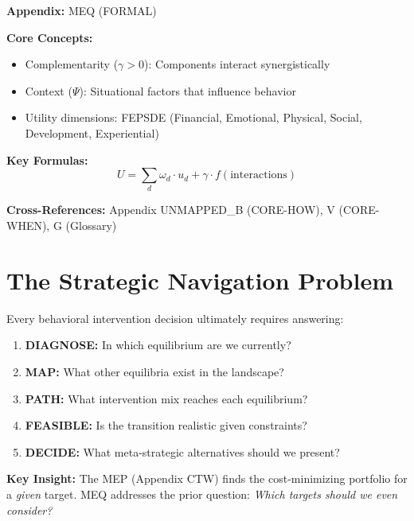 \begin{tcolorbox}[colback=blue!5!white, colframe=blue!75!black,
    title=Quick Reference: Multiple Equilibria \& Strategic Navigation (MEQ)]

\textbf{Appendix:} MEQ (FORMAL)

\textbf{Core Concepts:}
\begin{itemize}[nosep]
\item Complementarity ($\gamma > 0$): Components interact synergistically
\item Context ($\Psi$): Situational factors that influence behavior
\item Utility dimensions: FEPSDE (Financial, Emotional, Physical, Social, Development, Experiential)
\end{itemize}

\textbf{Key Formulas:}
\begin{equation}
U = \sum_d \omega_d \cdot u_d + \gamma \cdot f(\text{interactions})
\end{equation}

\textbf{Cross-References:} Appendix UNMAPPED_B (CORE-HOW), V (CORE-WHEN), G (Glossary)
\end{tcolorbox}



\section{The Strategic Navigation Problem}
\label{sec:meq-problem}

\begin{tcolorbox}[colback=blue!5!white, colframe=blue!75!black,
    title=The Five Questions of Strategic Navigation]

Every behavioral intervention decision ultimately requires answering:

\begin{enumerate}
    \item \textbf{DIAGNOSE:} In which equilibrium are we currently?
    \item \textbf{MAP:} What other equilibria exist in the landscape?
    \item \textbf{PATH:} What intervention mix reaches each equilibrium?
    \item \textbf{FEASIBLE:} Is the transition realistic given constraints?
    \item \textbf{DECIDE:} What meta-strategic alternatives should we present?
\end{enumerate}

\textbf{Key Insight:} The MEP (Appendix CTW) finds the cost-minimizing portfolio
for a \textit{given} target. MEQ addresses the prior question: \textit{Which
targets should we even consider?}

\end{tcolorbox}

